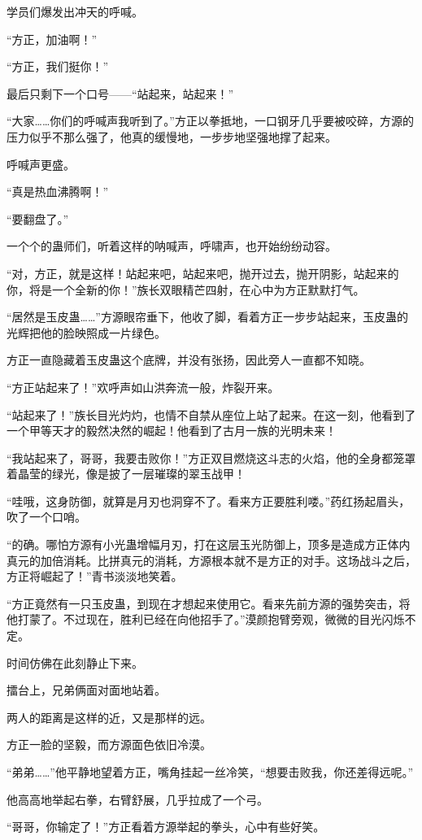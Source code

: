 \begin{this_body}
学员们爆发出冲天的呼喊。

“方正，加油啊！”

“方正，我们挺你！”

最后只剩下一个口号——“站起来，站起来！”

“大家……你们的呼喊声我听到了。”方正以拳抵地，一口钢牙几乎要被咬碎，方源的压力似乎不那么强了，他真的缓慢地，一步步地坚强地撑了起来。

呼喊声更盛。

“真是热血沸腾啊！”

“要翻盘了。”

一个个的蛊师们，听着这样的呐喊声，呼啸声，也开始纷纷动容。

“对，方正，就是这样！站起来吧，站起来吧，抛开过去，抛开阴影，站起来的你，将是一个全新的你！”族长双眼精芒四射，在心中为方正默默打气。

“居然是玉皮蛊……”方源眼帘垂下，他收了脚，看着方正一步步站起来，玉皮蛊的光辉把他的脸映照成一片绿色。

方正一直隐藏着玉皮蛊这个底牌，并没有张扬，因此旁人一直都不知晓。

“方正站起来了！”欢呼声如山洪奔流一般，炸裂开来。

“站起来了！”族长目光灼灼，也情不自禁从座位上站了起来。在这一刻，他看到了一个甲等天才的毅然决然的崛起！他看到了古月一族的光明未来！

“我站起来了，哥哥，我要击败你！”方正双目燃烧这斗志的火焰，他的全身都笼罩着晶莹的绿光，像是披了一层璀璨的翠玉战甲！

“哇哦，这身防御，就算是月刃也洞穿不了。看来方正要胜利喽。”药红扬起眉头，吹了一个口哨。

“的确。哪怕方源有小光蛊增幅月刃，打在这层玉光防御上，顶多是造成方正体内真元的加倍消耗。比拼真元的消耗，方源根本就不是方正的对手。这场战斗之后，方正将崛起了！”青书淡淡地笑着。

“方正竟然有一只玉皮蛊，到现在才想起来使用它。看来先前方源的强势突击，将他打蒙了。不过现在，胜利已经在向他招手了。”漠颜抱臂旁观，微微的目光闪烁不定。

时间仿佛在此刻静止下来。

擂台上，兄弟俩面对面地站着。

两人的距离是这样的近，又是那样的远。

方正一脸的坚毅，而方源面色依旧冷漠。

“弟弟……”他平静地望着方正，嘴角挂起一丝冷笑，“想要击败我，你还差得远呢。”

他高高地举起右拳，右臂舒展，几乎拉成了一个弓。

“哥哥，你输定了！”方正看着方源举起的拳头，心中有些好笑。


\end{this_body}
